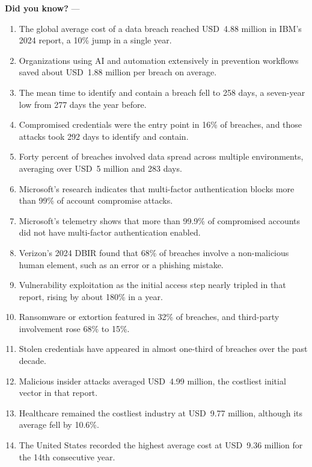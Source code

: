 \begin{tcolorbox}[
  colback=SoftYellow,
  colframe=IEEEblue!70!black,
  boxrule=0.5pt,
  arc=0mm,
  left=3mm,
  right=3mm,
  top=2mm,
  bottom=2mm
]
\small\RaggedRight \textbf{\color{IEEEblue!75!black}Did you know?} ---{\footnotesize\begin{enumerate}[leftmargin=1.6em,itemsep=1pt,topsep=1pt,parsep=0pt,partopsep=0pt]
\item The global average cost of a data breach reached USD~4.88 million in IBM's 2024 report, a 10\% jump in a single year.
\item Organizations using AI and automation extensively in prevention workflows saved about USD~1.88 million per breach on average.
\item The mean time to identify and contain a breach fell to 258 days, a seven-year low from 277 days the year before.
\item Compromised credentials were the entry point in 16\% of breaches, and those attacks took 292 days to identify and contain.
\item Forty percent of breaches involved data spread across multiple environments, averaging over USD~5 million and 283 days.
\item Microsoft's research indicates that multi-factor authentication blocks more than 99\% of account compromise attacks.
\item Microsoft's telemetry shows that more than 99.9\% of compromised accounts did not have multi-factor authentication enabled.
\item Verizon's 2024 DBIR found that 68\% of breaches involve a non-malicious human element, such as an error or a phishing mistake.
\item Vulnerability exploitation as the initial access step nearly tripled in that report, rising by about 180\% in a year.
\item Ransomware or extortion featured in 32\% of breaches, and third-party involvement rose 68\% to 15\%.
\item Stolen credentials have appeared in almost one-third of breaches over the past decade.
\item Malicious insider attacks averaged USD~4.99 million, the costliest initial vector in that report.
\item Healthcare remained the costliest industry at USD~9.77 million, although its average fell by 10.6\%.
\item The United States recorded the highest average cost at USD~9.36 million for the 14th consecutive year.

\end{enumerate}}
\end{tcolorbox}
